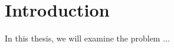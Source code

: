 \documentclass[thesis.tex]{subfiles}
\begin{document}
\chapter{Introduction}
\label{sec:introduction}
In this thesis, we will examine the problem ...
\biblio
\end{document}
